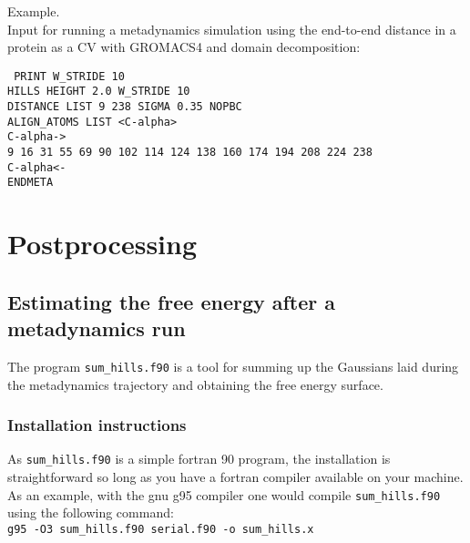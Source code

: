 \documentclass[12pt,fleqn]{report}
\newcommand{\keyword}[1]{\index{Keywords!{\tt #1}} {\tt #1}}
\newcommand{\esempio}[1]{
\vspace{10pt}
\begin{flushright}
\colorbox{light-gray}{
   \begin{minipage}{13cm}
       \scriptsize{
{\fontfamily{phv} \fontseries{b}
 \selectfont Example. \\
 \fontseries{m} \selectfont #1 } }
\end{minipage}}
\end{flushright}
\vspace{20pt}
}
\begin{document}

\esempio{
Input for running a metadynamics simulation using the end-to-end distance
in a protein as a CV with GROMACS4 and domain decomposition:

{\tt
PRINT W\_STRIDE 10 \\
HILLS HEIGHT 2.0 W\_STRIDE 10 \\
DISTANCE LIST 9 238 SIGMA 0.35 NOPBC \\
ALIGN\_ATOMS LIST <C-alpha> \\
C-alpha-> \\
 9 16 31 55 69 90 102 114 124 138 160 174 194 208 224 238 \\
C-alpha<- \\
ENDMETA
}
}

\chapter{Postprocessing}

\section{Estimating the free energy after a metadynamics run}
\label{sc.sumhills}
The program {\tt sum\_hills.f90} is a tool for summing up the Gaussians laid during the
metadynamics trajectory and obtaining the free energy surface.

\subsection{Installation instructions}
As {\tt sum\_hills.f90} is a simple fortran 90 program, the installation is straightforward
so long as you have a fortran compiler available on your machine.
As an example, with the gnu g95 compiler one would compile {\tt sum\_hills.f90} using the following
command:
\vspace {10pt} \\
 {\tt g95 -O3 sum\_hills.f90 serial.f90 -o sum\_hills.x}
\end{document}
